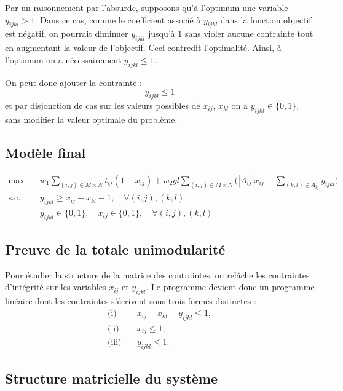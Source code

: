 \documentclass[a4paper,11pt]{article}
\begin{document}
Par un raisonnement par l'absurde, supposons qu'à l'optimum une variable \(y_{ijkl} > 1\).  
Dans ce cas, comme le coefficient associé à \(y_{ijkl}\) dans la fonction objectif est négatif, on pourrait diminuer \(y_{ijkl}\) jusqu’à \(1\) sans violer aucune contrainte tout en augmentant la valeur de l’objectif.  
Ceci contredit l’optimalité.  
Ainsi, à l’optimum on a nécessairement \(y_{ijkl} \le 1\).  

On peut donc ajouter la contrainte :
\[
y_{ijkl} \le 1
\]
et par disjonction de cas sur les valeurs possibles de $x_{ij}$, $x_{kl}$ on a \(y_{ijkl} \in \{0,1\}\), sans modifier la valeur optimale du problème.

\subsection{Modèle final}
\begin{align*}
\max \quad & w_1 \sum_{(i,j)\in M\times N} t_{ij} (1 - x_{ij}) 
+ w_2 g l \sum_{(i,j)\in M\times N} \Big( |A_{ij}| x_{ij} - \sum_{(k,l)\in A_{ij}} y_{ijkl} \Big) \\
\text{s.c.} \quad 
& y_{ijkl} \ge x_{ij} + x_{kl} - 1, \quad \forall (i,j),(k,l) \\
& y_{ijkl} \in \{0,1\} , \quad x_{ij} \in \{0,1\}, \quad \forall (i,j),(k,l)
\end{align*}
\subsection{Preuve de la totale unimodularité}


Pour étudier la structure de la matrice des contraintes, on relâche les contraintes d’intégrité sur les variables \(x_{ij}\) et \(y_{ijkl}\).  
Le programme devient donc un programme linéaire dont les contraintes s’écrivent sous trois formes distinctes :
\begin{align*}
\text{(i)} &\quad x_{ij} + x_{kl} - y_{ijkl} \le 1, \\
\text{(ii)} &\quad x_{ij} \le 1, \\
\text{(iii)} &\quad y_{ijkl} \le 1.
\end{align*}

\subsection{Structure matricielle du système}
\end{document}
